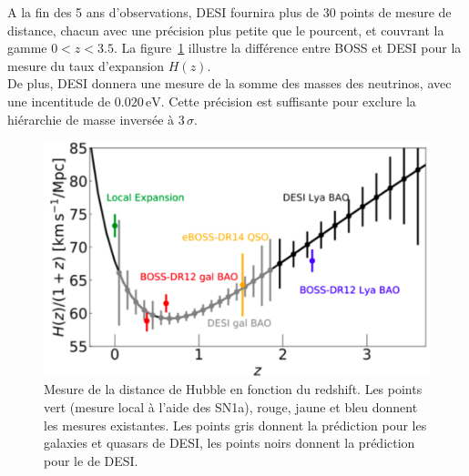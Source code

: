 \documentclass[11pt, twoside, a4paper, openright]{report}
\begin{document}
A la fin des 5 ans d'observations, DESI fournira plus de 30 points de mesure de distance, chacun avec une précision plus petite que le pourcent, et couvrant la gamme $\num{0}< z < \num{3.5}$. La figure~\ref{fig:DesiVsEboss} illustre la différence entre BOSS et DESI pour la mesure du taux d'expansion $H(z)$.\\
De plus, DESI donnera une mesure de la somme des masses des neutrinos, avec une incentitude de $\num{0,020}\,\mathrm{eV}$. Cette précision est suffisante pour exclure la hiérarchie de masse inversée à $3\,\sigma$.


\begin{figure}
  \centering
  \includegraphics[scale=0.3]{DesiVsEboss}
  \caption{Mesure de la distance de Hubble en fonction du redshift. Les points vert (mesure local \`a l'aide des SN1a), rouge, jaune et bleu donnent les mesures existantes. Les points gris donnent la prédiction pour les galaxies et quasars de DESI, les points noirs donnent la prédiction pour le \lya{} de DESI.}
  \label{fig:DesiVsEboss}
\end{figure}

% 
\printbibliography
\end{document}
